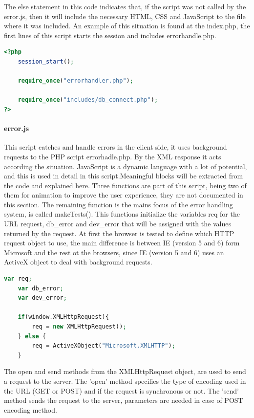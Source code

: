 The else statement in this code indicates that, if the script was not called by the error.js, then it will include the necessary HTML, CSS and JavaScript to the file where it was included.
\p
An example of this situation is found at the index.php, the first lines of this script starts the session and includes errorhandle.php.

\begin{lstlisting}[language=php]
<?php
	session_start();
	
	require_once("errorhandler.php");
	
	require_once("includes/db_connect.php");
?>
\end{lstlisting}

\paragraph{error.js}
This script catches and handle errors in the client side, it uses background requests to the PHP script errorhadle.php. By the XML response it acts according the situation. JavaScript is a dynamic language with a lot of potential, and this is used in detail in this script.Meaningful blocks will be extracted from the code and explained here.
\p
Three functions are part of this script, being two of them for animation to improve the user experience, they are not documented in this section. The remaining function is the mains focus of the error handling system, is called makeTests().
\p
This functions initialize the variables req for the URL request, db\_error and dev\_error that will be assigned with the values returned by the request.
At first the browser is tested to define which HTTP request object to use, the main difference is between IE (version 5 and 6) form Microsoft and the rest ot the browsers, since IE (version 5 and 6) uses an ActiveX object to deal with background requests.
\begin{lstlisting}[language=php]
	var req;
	var db_error;
	var dev_error;
	
	if(window.XMLHttpRequest){
		req	= new XMLHttpRequest();
	} else {
		req = ActiveXObject("Microsoft.XMLHTTP");	
	}
\end{lstlisting}

The open and send methods from the XMLHttpRequest object, are used to send a request to the server. The 'open' method specifies the type of encoding used in the URL (GET or POST) and if the request is synchronous or not. The 'send' method sends the request to the server, parameters are needed in case of POST encoding method. 

